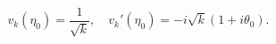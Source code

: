 \begin{equation}\label{eq:Danielsson-v}
v_k(\eta_0)=\frac{1}{\sqrt{k}},\quad 
v_k'(\eta_0)=-i\sqrt{k}\left(1+i\theta_0\right).
\end{equation}

